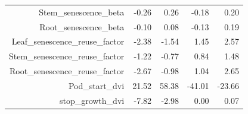\begin{table}[ht]
\begin{tabular}{rrrrr}
  Stem\_senescence\_beta & -0.26 & 0.26 & -0.18 & 0.20 \\ 
  Root\_senescence\_beta & -0.10 & 0.08 & -0.13 & 0.19 \\ 
  Leaf\_senescence\_reuse\_factor & -2.38 & -1.54 & 1.45 & 2.57 \\ 
  Stem\_senescence\_reuse\_factor & -1.22 & -0.77 & 0.84 & 1.48 \\ 
  Root\_senescence\_reuse\_factor & -2.67 & -0.98 & 1.04 & 2.65 \\ 
  Pod\_start\_dvi & 21.52 & 58.38 & -41.01 & -23.66 \\ 
  stop\_growth\_dvi & -7.82 & -2.98 & 0.00 & 0.07 \\ 
   \hline
\end{tabular}
\end{table}
